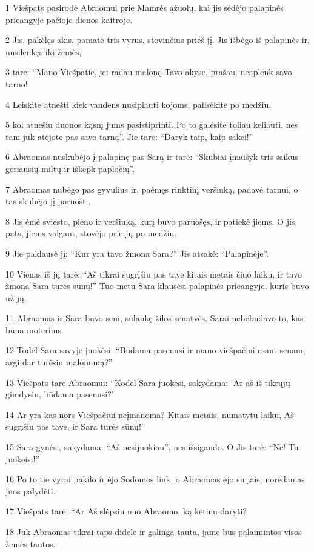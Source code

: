 \par 1 Viešpats pasirodė Abraomui prie Mamrės ąžuolų, kai jis sėdėjo palapinės prieangyje pačioje dienos kaitroje. 
\par 2 Jis, pakėlęs akis, pamatė tris vyrus, stovinčius prieš jį. Jis išbėgo iš palapinės ir, nusilenkęs iki žemės, 
\par 3 tarė: “Mano Viešpatie, jei radau malonę Tavo akyse, prašau, neaplenk savo tarno! 
\par 4 Leiskite atnešti kiek vandens nusiplauti kojoms, pailsėkite po medžiu, 
\par 5 kol atnešiu duonos kąsnį jums pasistiprinti. Po to galėsite toliau keliauti, nes tam juk atėjote pas savo tarną”. Jie tarė: “Daryk taip, kaip sakei!” 
\par 6 Abraomas nuskubėjo į palapinę pas Sarą ir tarė: “Skubiai įmaišyk tris saikus geriausių miltų ir iškepk papločių”. 
\par 7 Abraomas nubėgo pas gyvulius ir, paėmęs rinktinį veršiuką, padavė tarnui, o tas skubėjo jį paruošti. 
\par 8 Jis ėmė sviesto, pieno ir veršiuką, kurį buvo paruošęs, ir patiekė jiems. O jis pats, jiems valgant, stovėjo prie jų po medžiu. 
\par 9 Jie paklausė jį: “Kur yra tavo žmona Sara?” Jis atsakė: “Palapinėje”. 
\par 10 Vienas iš jų tarė: “Aš tikrai sugrįšiu pas tave kitais metais šiuo laiku, ir tavo žmona Sara turės sūnų!” Tuo metu Sara klausėsi palapinės prieangyje, kuris buvo už jų. 
\par 11 Abraomas ir Sara buvo seni, sulaukę žilos senatvės. Sarai nebebūdavo to, kas būna moterims. 
\par 12 Todėl Sara savyje juokėsi: “Būdama pasenusi ir mano viešpačiui esant senam, argi dar turėsiu malonumą?” 
\par 13 Viešpats tarė Abraomui: “Kodėl Sara juokėsi, sakydama: ‘Ar aš iš tikrųjų gimdysiu, būdama pasenusi?’ 
\par 14 Ar yra kas nors Viešpačiui neįmanoma? Kitais metais, numatytu laiku, Aš sugrįšiu pas tave, ir Sara turės sūnų!” 
\par 15 Sara gynėsi, sakydama: “Aš nesijuokiau”, nes išsigando. O Jis tarė: “Ne! Tu juokeisi!” 
\par 16 Po to tie vyrai pakilo ir ėjo Sodomos link, o Abraomas ėjo su jais, norėdamas juos palydėti. 
\par 17 Viešpats tarė: “Ar Aš slėpsiu nuo Abraomo, ką ketinu daryti? 
\par 18 Juk Abraomas tikrai taps didele ir galinga tauta, jame bus palaimintos visos žemės tautos. 
